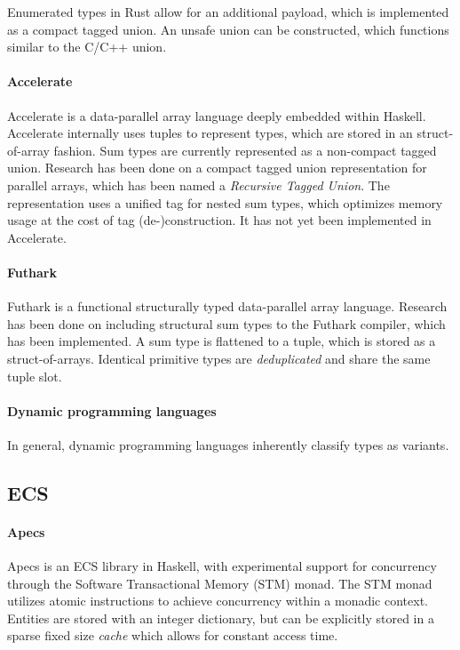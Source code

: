 \documentclass{article}
\begin{document}
Enumerated types in Rust allow for an additional payload, which is implemented as a compact tagged union. 
An unsafe union can be constructed, which functions similar to the C/C++ union.

\paragraph{Accelerate}

Accelerate is a data-parallel array language deeply embedded within Haskell.
Accelerate internally uses tuples to represent types, which are stored in an struct-of-array fashion.
Sum types are currently represented as a non-compact tagged union.
Research has been done on a compact tagged union representation for parallel arrays, which has been named a {\it Recursive Tagged Union}\cite{accelerate-sum-types}.
The representation uses a unified tag for nested sum types, which optimizes memory usage at the cost of tag (de-)construction.  
It has not yet been implemented in Accelerate.

\paragraph{Futhark}

Futhark is a functional structurally typed data-parallel array language.
Research has been done on including structural sum types to the Futhark compiler\cite{futhark-sum-types}, which has been implemented.
A sum type is flattened to a tuple, which is stored as a struct-of-arrays. 
Identical primitive types are {\it deduplicated} and share the same tuple slot.

\paragraph{Dynamic programming languages}

In general, dynamic programming languages inherently classify types as variants.

\subsection{ECS}

\paragraph{Apecs}

Apecs\cite{ecs-apecs} is an ECS library in Haskell, with experimental support for concurrency through the Software Transactional Memory (STM) monad\cite{STM-monad}.
The STM monad utilizes atomic instructions to achieve concurrency within a monadic context.
Entities are stored with an integer dictionary, but can be explicitly stored in a sparse fixed size {\it cache} which allows for constant access time. 
\end{document}
